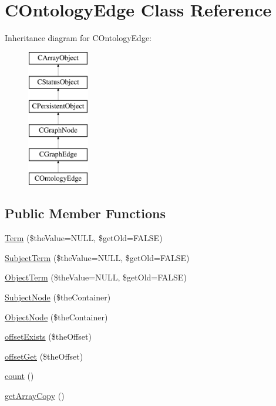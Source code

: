 \hypertarget{class_c_ontology_edge}{\section{C\-Ontology\-Edge Class Reference}
\label{class_c_ontology_edge}
}
Inheritance diagram for C\-Ontology\-Edge\-:\begin{figure}[H]
\begin{center}
\leavevmode
\includegraphics[height=6.000000cm]{class_c_ontology_edge}
\end{center}
\end{figure}
\subsection*{Public Member Functions}
\begin{DoxyCompactItemize}
\item 
\hyperlink{class_c_ontology_edge_acc739f853b1e64a3a36926dfd83fe7b4}{Term} (\$the\-Value=N\-U\-L\-L, \$get\-Old=F\-A\-L\-S\-E)
\item 
\hyperlink{class_c_ontology_edge_a3196d6612dbbbbbe18643b1af06378b4}{Subject\-Term} (\$the\-Value=N\-U\-L\-L, \$get\-Old=F\-A\-L\-S\-E)
\item 
\hyperlink{class_c_ontology_edge_a83ac612393cc615101992972b419faa5}{Object\-Term} (\$the\-Value=N\-U\-L\-L, \$get\-Old=F\-A\-L\-S\-E)
\item 
\hyperlink{class_c_ontology_edge_a68efd237a5a6079dc5c679183192d2dc}{Subject\-Node} (\$the\-Container)
\item 
\hyperlink{class_c_ontology_edge_a116f7950d0e7d744e12156c7f244b7b0}{Object\-Node} (\$the\-Container)
\item 
\hyperlink{class_c_ontology_edge_a009263d75d6128d2b62d6294febe6d02}{offset\-Exists} (\$the\-Offset)
\item 
\hyperlink{class_c_ontology_edge_a371744cd3e3bb699c12dad85c6ea3e54}{offset\-Get} (\$the\-Offset)
\item 
\hyperlink{class_c_ontology_edge_a8844ca89c568f127ab4e16fe9552c85b}{count} ()
\item 
\hyperlink{class_c_ontology_edge_a5661a9878ca8028bd656ecc7b193b26a}{get\-Array\-Copy} ()
\end{DoxyCompactItemize}
